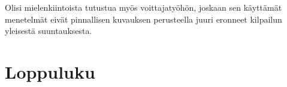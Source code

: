 Olisi mielenkiintoista tutustua myös voittajatyöhön, joskaan sen käyttämät menetelmät eivät pinnallisen
kuvauksen perusteella juuri eronneet kilpailun yleisestä suuntauksesta.





































\section{Loppuluku}




